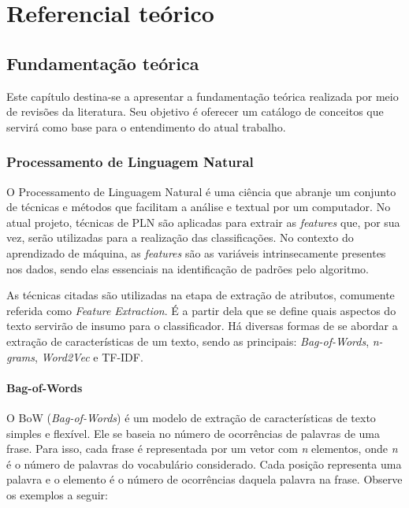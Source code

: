 \part{Referencial teórico}

\chapter[Fundamentação teórica]{Fundamentação teórica}

Este capítulo destina-se a apresentar a fundamentação teórica realizada por meio de revisões da literatura. Seu objetivo é oferecer um catálogo de conceitos que servirá como base para o entendimento do atual trabalho.

\section[Processamento de Linguagem	 Natural]{Processamento de Linguagem Natural}

O Processamento de Linguagem Natural é uma ciência que abranje um conjunto de técnicas e métodos que facilitam a análise e textual por um computador. No atual projeto, técnicas de PLN são aplicadas para extrair as \textit{features} que, por sua vez, serão utilizadas para a realização das classificações. No contexto do aprendizado de máquina, as \textit{features} são as variáveis intrinsecamente presentes nos dados, sendo elas essenciais na identificação de padrões pelo algoritmo.

As técnicas citadas são utilizadas na etapa de extração de atributos, comumente referida como \textit{Feature Extraction}. É a partir dela que se define quais aspectos do texto servirão de insumo para o classificador. Há diversas formas de se abordar a extração de características de um texto, sendo as principais: \textit{Bag-of-Words}, \textit{n-grams}, \textit{Word2Vec} e TF-IDF.

\subsection{Bag-of-Words}

O BoW (\textit{Bag-of-Words}) é um modelo de extração de características de texto simples e flexível. Ele se baseia no número de ocorrências de palavras de uma frase. Para isso, cada frase é representada por um vetor com \textit{n} elementos, onde \textit{n} é o número de palavras do vocabulário considerado. Cada posição representa uma palavra e o elemento é o número de ocorrências daquela palavra na frase. Observe os exemplos a seguir:


